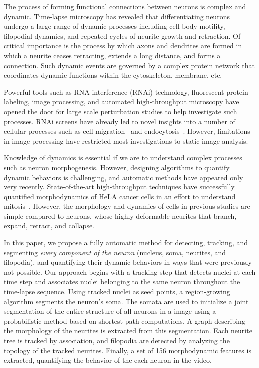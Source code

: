 

The  process  of forming  functional  connections  between neurons  is
complex  and   dynamic.   Time-lapse  microscopy   has  revealed  that
differentiating  neurons undergo  a large  range of  dynamic processes
including cell body motility, filopodial dynamics, and repeated cycles
of  neurite growth  and  retraction.  Of  critical  importance is  the
process  by which  axons and  dendrites are  formed in  which a neurite
ceases retracting, extends a   long  distance, and  forms
a connection. Such  dynamic events are  governed by a  complex protein
network that  coordinates   dynamic functions 
within the cytoskeleton, membrane, etc.

Powerful tools such as 
RNA interference  (RNAi)
technology,  fluorescent  protein   labeling,  image  processing,  and
automated high-throughput  microscopy have  opened the door  for large
scale  perturbation studies to help investigate such processes. RNAi  screens have  already led  to novel
insights   into  a  number   of  cellular   processes  such   as  cell
migration~\cite{Bakal07}  and endocytosis~\cite{Collinet10}.  However,
limitations  in  image  processing  have  restricted  most
investigations to static image analysis.

Knowledge  of dynamics is  essential if we are  to understand
complex  processes such  as neuron  morphogenesis.  However, designing
algorithms to quantify dynamic  behaviors is challenging, and
automatic methods  have appeared only  very recently. State-of-the-art
high-throughput techniques have successfully quantified morphodynamics
of  HeLA cancer  cells  in an  effort  to understand 
mitosis~\cite{Held10,Neumann10,Zhu05}.   However,  the morphology  and
dynamics of  cells in previous studies are simple compared to neurons,
whose highly deformable  neurites that branch, expand,
retract, and collapse. 

In this paper, we propose a  fully automatic method for detecting, tracking, and
segmenting {\em  every component  of the neuron}  (nucleus, soma,  neurites, and
filopodia), and quantifying their dynamic behaviors in ways that were previously
not possible. Our  approach begins with a tracking step that detects nuclei at each  time step and
associates nuclei  belonging to the  same neuron  throughout the
time-lapse sequence.
Using tracked nuclei as  seed points, a region-growing  algorithm segments
the neuron's soma.  The somata are  used to initialize a  joint segmentation of
the entire structure  of all neurons in a  image using a probabilistic
method based on  shortest path computations.  A graph  describing the morphology
of  the neurites  is extracted  from this  segmentation.  Each  neurite  tree is
tracked by association, and filopodia  are detected by analyzing the topology of
the tracked  neurites.  Finally,  a set of  156  morphodynamic  features is
extracted, quantifying the behavior of the each neuron in the video.


